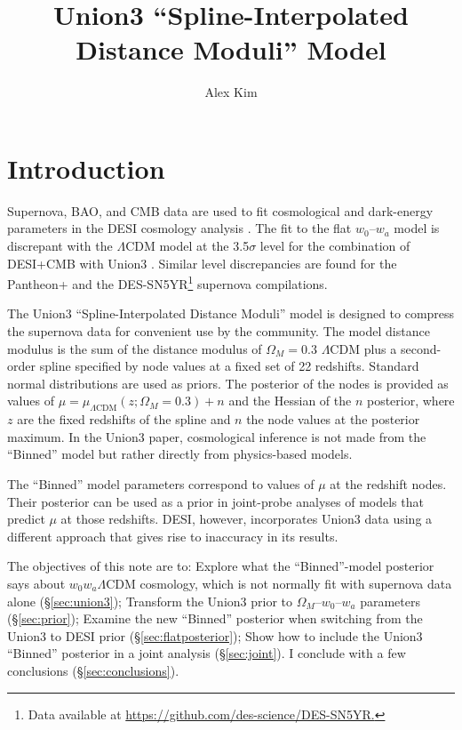 \documentclass[11pt,a4paper]{article}
\title{Union3 ``Spline-Interpolated Distance Moduli'' Model}
\author[a]{Alex Kim}
\affiliation[a]{Lawrence Berkeley National Laboratory}
\begin{document}
\maketitle

\section{Introduction}
Supernova, BAO, and CMB data are used to fit cosmological and dark-energy parameters in the DESI cosmology
analysis \cite{2024arXiv240403002D}.  The fit to the flat $w_0$--$w_a$ model is discrepant with the $\Lambda$CDM
model at the 3.5$\sigma$ level for the combination of DESI+CMB with Union3  \cite{2023arXiv231112098R}.
Similar level discrepancies are found for the Pantheon+ \cite{2022ApJ...938..113S} and the DES-SN5YR\footnote{Data available at \url{https://github.com/des-science/DES-SN5YR.}} supernova compilations.



The Union3 ``Spline-Interpolated Distance Moduli'' model is designed to compress the  supernova data for convenient use by the community.  
The  model distance modulus
is the sum of the distance modulus of $\Omega_M=0.3$  $\Lambda$CDM plus a second-order spline specified by node values
at a fixed set of 22 redshifts.   Standard normal distributions are used as priors.  
The posterior of the nodes is provided  as values of
$\mu = \mu_{\Lambda \text{CDM}}(z;\Omega_M=0.3) + n$ and the Hessian of the $n$ posterior,
where $z$ are the fixed redshifts of the spline and $n$ the node values at the posterior maximum.
In the Union3 paper, cosmological inference is not made from the ``Binned'' model but rather directly from physics-based models.

The ``Binned'' model parameters correspond to values of $\mu$ at the redshift nodes.
Their  posterior can  be used as a prior in joint-probe analyses of models that predict $\mu$ at those redshifts. 
DESI, however, incorporates Union3 data using a different approach that gives rise to inaccuracy in its results.

The objectives of this note are to: Explore what the ``Binned''-model posterior says about $w_0w_a\Lambda$CDM cosmology, which is not normally
fit with  supernova data alone (\S\ref{sec:union3}); Transform the Union3 prior to $\Omega_M$--$w_0$--$w_a$ parameters
(\S\ref{sec:prior});
Examine the new ``Binned'' posterior when switching from the Union3 to DESI prior
(\S\ref{sec:flatposterior}); Show how to include the Union3 ``Binned'' posterior in a joint analysis (\S\ref{sec:joint}).
I conclude with a few conclusions (\S\ref{sec:conclusions}).
\end{document}
